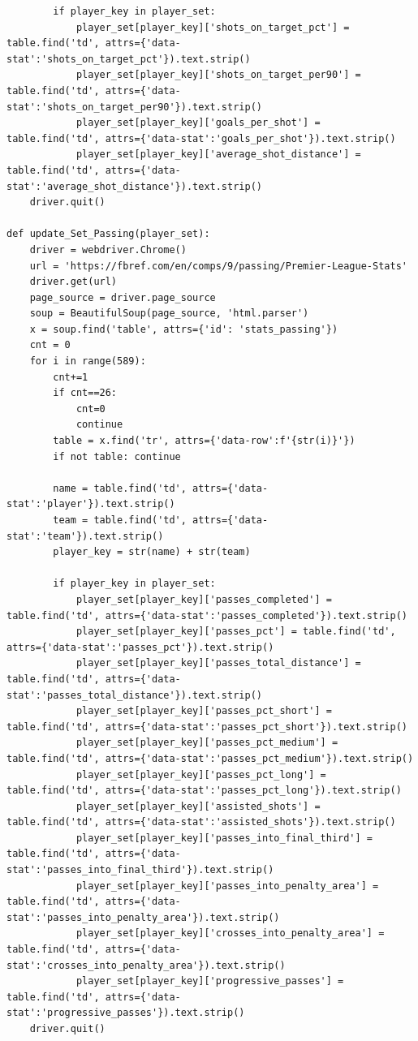 \documentclass[12pt]{report}
\begin{document}
{\begin{lstlisting}
        if player_key in player_set:
            player_set[player_key]['shots_on_target_pct'] = table.find('td', attrs={'data-stat':'shots_on_target_pct'}).text.strip()
            player_set[player_key]['shots_on_target_per90'] = table.find('td', attrs={'data-stat':'shots_on_target_per90'}).text.strip()
            player_set[player_key]['goals_per_shot'] = table.find('td', attrs={'data-stat':'goals_per_shot'}).text.strip()
            player_set[player_key]['average_shot_distance'] = table.find('td', attrs={'data-stat':'average_shot_distance'}).text.strip()
    driver.quit()

def update_Set_Passing(player_set):
    driver = webdriver.Chrome()
    url = 'https://fbref.com/en/comps/9/passing/Premier-League-Stats'
    driver.get(url)
    page_source = driver.page_source
    soup = BeautifulSoup(page_source, 'html.parser')
    x = soup.find('table', attrs={'id': 'stats_passing'})
    cnt = 0
    for i in range(589):
        cnt+=1
        if cnt==26:
            cnt=0
            continue
        table = x.find('tr', attrs={'data-row':f'{str(i)}'})
        if not table: continue

        name = table.find('td', attrs={'data-stat':'player'}).text.strip()
        team = table.find('td', attrs={'data-stat':'team'}).text.strip()
        player_key = str(name) + str(team)

        if player_key in player_set:
            player_set[player_key]['passes_completed'] = table.find('td', attrs={'data-stat':'passes_completed'}).text.strip()
            player_set[player_key]['passes_pct'] = table.find('td', attrs={'data-stat':'passes_pct'}).text.strip()
            player_set[player_key]['passes_total_distance'] = table.find('td', attrs={'data-stat':'passes_total_distance'}).text.strip()
            player_set[player_key]['passes_pct_short'] = table.find('td', attrs={'data-stat':'passes_pct_short'}).text.strip()
            player_set[player_key]['passes_pct_medium'] = table.find('td', attrs={'data-stat':'passes_pct_medium'}).text.strip()
            player_set[player_key]['passes_pct_long'] = table.find('td', attrs={'data-stat':'passes_pct_long'}).text.strip()
            player_set[player_key]['assisted_shots'] = table.find('td', attrs={'data-stat':'assisted_shots'}).text.strip()
            player_set[player_key]['passes_into_final_third'] = table.find('td', attrs={'data-stat':'passes_into_final_third'}).text.strip()
            player_set[player_key]['passes_into_penalty_area'] = table.find('td', attrs={'data-stat':'passes_into_penalty_area'}).text.strip()
            player_set[player_key]['crosses_into_penalty_area'] = table.find('td', attrs={'data-stat':'crosses_into_penalty_area'}).text.strip()
            player_set[player_key]['progressive_passes'] = table.find('td', attrs={'data-stat':'progressive_passes'}).text.strip()
    driver.quit()



\end{lstlisting}}
\end{document}
